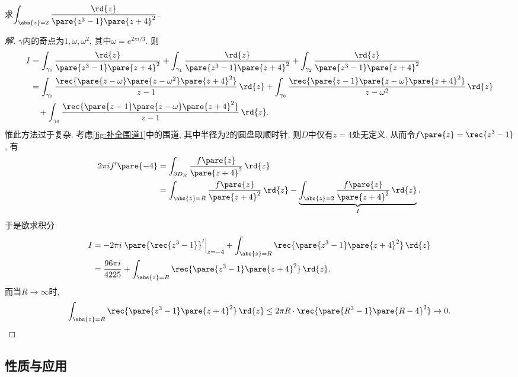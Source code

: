 \documentclass{ctexart}
\begin{document}
\begin{sample}
    \begin{ex}
        \label{ex:补全围道示意}
        求$\displaystyle \int_{\abs{z}=2} \frac{\rd{z}}{\pare{z^3-1}\pare{z+4}^2}$.
    \end{ex}
    \begin{proof}[解]
        $\gamma$内的奇点为$1,\omega,\omega^2$, 其中$\omega = e^{2\pi i/3}$. 则
        \begin{align*}
            I &= \int_{\gamma_0} \frac{\rd{z}}{\pare{z^3-1}\pare{z+4}^2} + \int_{\gamma_1} \frac{\rd{z}}{\pare{z^3-1}\pare{z+4}^2} + \int_{\gamma_2} \frac{\rd{z}}{\pare{z^3-1}\pare{z+4}^2} \\
            &= \int_{\gamma_0} \frac{\rec{\pare{z-\omega}\pare{z-\omega^2}\pare{z+4}^2}}{z-1}\,\rd{z} + \int_{\gamma_0} \frac{\rec{\pare{z-1}\pare{z-\omega}\pare{z+4}^2}}{z-\omega^2}\,\rd{z} \\ &\phantom{=}\, + \int_{\gamma_0} \frac{\rec{\pare{z-1}\pare{z-\omega}\pare{z+4}^2}}{z-1}\,\rd{z}.
        \end{align*}
        惟此方法过于复杂. 考虑\cref{fig:补全围道1}中的围道, 其中半径为$2$的圆盘取顺时针, 则$D$中仅有$z=4$处无定义. 从而令$f\pare{z} = \displaystyle \rec{z^3-1}$, 有
        \begin{align*}
            2\pi if'\pare{-4} &= \int_{\partial D_R} \frac{f\pare{z}}{\pare{z+4}^2}\,\rd{z} \\
            &= \int_{\abs{z}=R} \frac{f\pare{z}}{\pare{z+4}^2}\,\rd{z} - \underbrace{\int_{\abs{z}=2} \frac{f\pare{z}}{\pare{z+4}^2}\,\rd{z}}_{I}.
        \end{align*}
        于是欲求积分
        \begin{align*}
            I &= -2\pi i \left.\pare{\rec{z^3-1}}'\right\vert_{z=-4} + \int_{\abs{z}=R} \rec{\pare{z^3-1}\pare{z+4}^2}\,\rd{z} \\
            &= \frac{96\pi i}{4225} + \int_{\abs{z}=R} \rec{\pare{z^3-1}\pare{z+4}^2}\,\rd{z}.
        \end{align*}
        而当$R\rightarrow \infty$时,
        \[ \int_{\abs{z}=R} \rec{\pare{z^3-1}\pare{z+4}^2}\,\rd{z} \le 2\pi R \cdot \rec{\pare{R^3-1}\pare{R-4}^2} \rightarrow 0. \qedhere \]
    \end{proof}
\end{sample}



\subsection{性质与应用} %
\label{sub:性质与应用}
\end{document}
